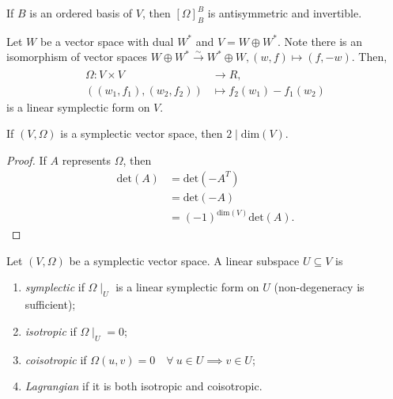 \documentclass[12pt]{book}
\begin{document}
\begin{Rmk}\label{Rmk: Representation of symplectic forms}
    If $B$ is an ordered basis of $V$, then $[\Omega]_B^B$ is antisymmetric and invertible.
\end{Rmk}

\begin{Exp}
    Let $W$ be a vector space with dual $W^\ast$ and $V=W\oplus W^\ast$. Note there is an isomorphism of vector spaces $W\oplus W^\ast\xrightarrow[]{\sim} W^\ast\oplus W, (w,f)\mapsto (f,-w)$. Then,
    \begin{align*}
        \Omega:V\times V &\to R, \\
        ((w_1,f_1),(w_2,f_2)) &\mapsto f_2(w_1) - f_1(w_2)
    \end{align*}
    is a linear symplectic form on $V$.
\end{Exp}

\begin{Lmm}
    If $(V,\Omega)$ is a symplectic vector space, then $2\mid\text{dim}(V)$.

    \begin{proof}
    
        If $A$ represents $\Omega$, then
        \begin{align*}
            \text{det}(A) &= \text{det}(-A^T) \\
                          &= \text{det}(-A) \\
                          &= (-1)^{\text{dim}(V)}\text{det}(A).
        \end{align*}
    \end{proof}
\end{Lmm}

\begin{Dfn}\label{Dfn: Symplectic, isotropic, coisotropic and Lagrangian subspaces}
    Let $(V,\Omega)$ be a symplectic vector space. A linear subspace $U\subseteq V$ is
    \begin{enumerate}[label=\DfnLbl]
    
        \item \emph{symplectic} if $\Omega\mid_U$ is a linear symplectic form on $U$ (non-degeneracy is sufficient);

        \item \emph{isotropic} if $\Omega\mid_U=0$;

        \item \emph{coisotropic} if $\Omega(u,v)=0 \quad \forall \ u\in U \implies v\in U$;

        \item \emph{Lagrangian} if it is both isotropic and coisotropic.
    \end{enumerate}
\end{Dfn}
\end{document}
